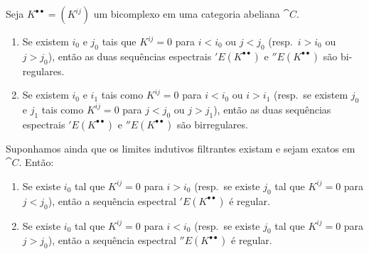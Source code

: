 \begin{proposition}[11.3.3]
\label{0.11.3.3}
Seja $K^{\bullet\bullet}=(K^{ij})$ um bicomplexo em uma categoria abeliana $\cat{C}$.
\begin{enumerate}
  \item[{\rm(i) }] Se existem $i_0$ e $j_0$ tais que $K^{ij}=0$ para $i<i_0$ ou $j<j_0$ (resp.~$i>i_0$ ou $j>j_0$), então as duas sequências espectrais $'E(K^{\bullet\bullet})$ e $''E(K^{\bullet\bullet})$ são bi-regulares.
  \item[{\rm(ii) }] Se existem $i_0$ e $i_1$ tais como $K^{ij}=0$ para $i<i_0$ ou $i>i_1$ (resp.~se existem $j_0$ e $j_1$ tais como $K^{ij}=0$ para $j<j_0$ ou $j>j_1$), então as duas sequências espectrais $'E(K^{\bullet\bullet})$ e $''E(K^{\bullet\bullet})$ são birregulares.
\end{enumerate}
Suponhamos ainda que os limites indutivos filtrantes existam e sejam exatos em $\cat{C}$. Então:
\begin{enumerate}
  \item[{\rm(iii) }] Se existe $i_0$ tal que $K^{ij}=0$ para $i>i_0$ (resp.~se existe $j_0$ tal que $K^{ij}=0$ para $j<j_0$), então a sequência espectral $'E(K^{\bullet\bullet})$ é regular.
  \item[{\rm(iv) }] Se existe $i_0$ tal que $K^{ij}=0$ para $i<i_0$ (resp.~se existe $j_0$ tal que $K^{ij}=0$ para $j>j_0$), então a sequência espectral $''E(K^{\bullet\bullet})$ é regular.
\end{enumerate}
\end{proposition}

